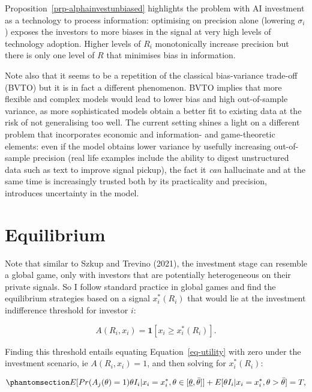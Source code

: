 \documentclass[
]{article}
\theoremstyle{plain}
\theoremstyle{remark}
\begin{document}
Proposition~\ref{prp-alphainvestunbiased} highlights the problem with AI
investment as a technology to process information: optimising on
precision alone (lowering \(\sigma_i\)) exposes the investors to more
biases in the signal at very high levels of technology adoption. Higher
levels of \(R_i\) monotonically increase precision but there is only one
level of \(R\) that minimises bias in information.

Note also that it seems to be a repetition of the classical
bias-variance trade-off (BVTO) but it is in fact a different phenomenon.
BVTO implies that more flexible and complex models would lead to lower
bias and high out-of-sample variance, as more sophisticated models
obtain a better fit to existing data at the risk of not generalising too
well. The current setting shines a light on a different problem that
incorporates economic and information- and game-theoretic elements: even
if the model obtains lower variance by usefully increasing out-of-sample
precision (real life examples include the ability to digest unstructured
data such as text to improve signal pickup), the fact it \emph{can}
hallucinate and at the same time is increasingly trusted both by its
practicality and precision, introduces uncertainty in the model.

\section{Equilibrium}\label{equilibrium}

Note that similar to Szkup and Trevino (2021), the investment stage can
resemble a global game, only with investors that are potentially
heterogeneous on their private signals. So I follow standard practice in
global games and find the equilibrium strategies based on a signal
\(x_i^*(R_i)\) that would lie at the investment indifference threshold
for investor \(i\):

\[
A(R_i, x_i) = \mathbf{1}[x_i \geq x_i^*(R_i)].
\]

Finding this threshold entails equating Equation~\ref{eq-utility} with
zero under the investment scenario, ie \(A(R_i, x_i)=1\), and then
solving for \(x_i^*(R_i)\):

\begin{equation}\phantomsection\label{eq-equilinvest}{
E[Pr(A_j(\theta)=1)\theta I_i | x_i = x_i^*, \theta \in [\underline{\theta}, \bar{\theta}] ] + E[\theta I_i |x_i = x_i^*, \theta > \bar{\theta} ] = T,
}\end{equation}
\end{document}
